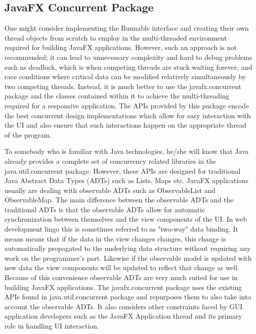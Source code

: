 \subsection{JavaFX Concurrent Package}
%
One might consider implementing the Runnable interface and creating their own thread objects from scratch to employ in the multi-threaded environment required for building JavaFX applications. However, such an approach is not recommended; it can lead to unnecessary complexity and hard to debug problems such as deadlock, which is when competing threads are stuck waiting forever, and race conditions where critical data can be modified relatively simultaneously by two competing threads. Instead, it is much better to use the javafx.concurrent package and the classes contained within it to achieve the multi-threading required for a responsive application. The APIs provided by this package encode the best concurrent design implementations which allow for easy interaction with the UI and also ensure that such interactions happen on the appropriate thread of the program. 

To somebody who is familiar with Java technologies, he/she will know that Java already provides a complete set of concurrency related libraries in the java.util.concurrent package. However, these APIs are designed for traditional Java Abstract Data Types (ADTs) such as Lists, Maps etc. JavaFX applications usually are dealing with observable ADTs such as ObservableList and ObservableMap. The main difference between the observable ADTs and the traditional ADTs is that the observable ADTs allow for automatic synchronization between themselves and the view components of the UI. In web development lingo this is sometimes referred to as "two-way" data binding. It means means that if the data in the view changes changes, this change is automatically propagated to the underlying data structure without requiring any work on the programmer's part. Likewise if the observable model is updated with new data the view components will be updated to reflect that change as well. Because of this convenience observable ADTs are very much suited for use in building JavaFX applications. The javafx.concurrent package uses the existing APIs found in java.util.concurrent package and repurposes them to also take into account the observable ADTs. It also considers other constraints faced by GUI application developers such as the JavaFX Application thread and its primary role in handling UI interaction. 

